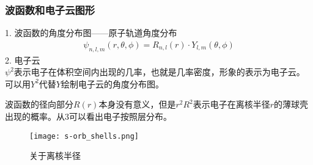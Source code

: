 \documentclass[utf8,a4paper,12pt]{ctexart}
\begin{document}
\subsubsection{波函数和电子云图形}
1. 波函数的角度分布图——原子轨道角度分布
\begin{align*}
\psi_{n,l,m}(r,\theta,\phi) = R_{n,l}(r) \cdot Y_{l,m}(\theta,\phi)
\end{align*}
2. 电子云\\
$\psi^2$表示电子在体积空间内出现的几率，也就是几率密度，形象的表示为电子云。\\
可以用$Y^2$代替$Y$绘制电子云的角度分布图。

波函数的径向部分$R(r)$本身没有意义，但是$r^2R^2$表示电子在离核半径$r$的薄球壳出现的概率。从\figurename{3}可以看出电子按照层分布。

\begin{figure}[H]
\centering
\texttt{[image: s-orb\_shells.png]}
\caption{关于离核半径}
\end{figure}
\end{document}
